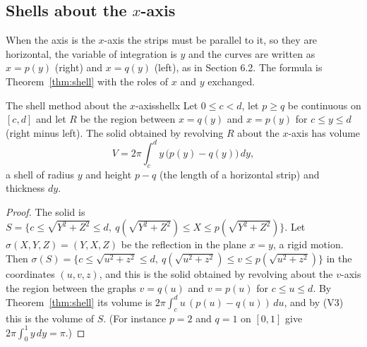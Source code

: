 \documentclass[11pt]{article}
\begin{document}
\subsection*{Shells about the $x$-axis}

When the axis is the $x$-axis the strips must be parallel to it, so they are horizontal, the variable of integration is $y$ and the curves are written as $x=p(y)$ (right) and $x=q(y)$ (left), as in Section 6.2. The formula is Theorem~\ref{thm:shell} with the roles of $x$ and $y$ exchanged.

\begin{thm}{The shell method about the $x$-axis}{shellx}
Let $0\le c<d$, let $p\ge q$ be continuous on $[c,d]$ and let $R$ be the region between $x=q(y)$ and $x=p(y)$ for $c\le y\le d$ (right minus left). The solid obtained by revolving $R$ about the $x$-axis has volume
\[
V=2\pi\int_c^dy\,\bigl(p(y)-q(y)\bigr)\,dy ,
\]
a shell of radius $y$ and height $p-q$ (the length of a horizontal strip) and thickness $dy$.
\end{thm}
\begin{proof}
The solid is $S=\{c\le\sqrt{Y^2+Z^2}\le d,\ q(\sqrt{Y^2+Z^2})\le X\le p(\sqrt{Y^2+Z^2})\}$. Let $\sigma(X,Y,Z)=(Y,X,Z)$ be the reflection in the plane $x=y$, a rigid motion. Then $\sigma(S)=\{c\le\sqrt{u^2+z^2}\le d,\ q(\sqrt{u^2+z^2})\le v\le p(\sqrt{u^2+z^2})\}$ in the coordinates $(u,v,z)$, and this is the solid obtained by revolving about the $v$-axis the region between the graphs $v=q(u)$ and $v=p(u)$ for $c\le u\le d$. By Theorem~\ref{thm:shell} its volume is $2\pi\int_c^du\,(p(u)-q(u))\,du$, and by (V3) this is the volume of $S$. (For instance $p=2$ and $q=1$ on $[0,1]$ give $2\pi\int_0^1y\,dy=\pi$.)
\end{proof}
\end{document}
